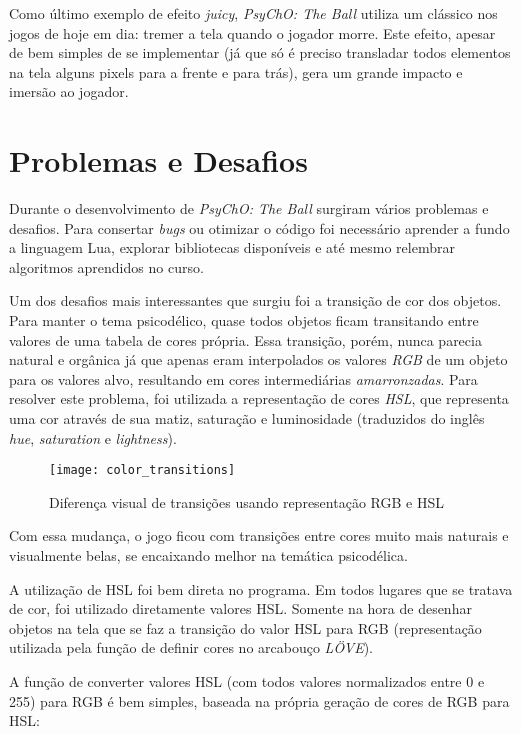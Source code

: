 Como último exemplo de efeito \textit{juicy}, \textit{PsyChO: The Ball} utiliza um clássico nos jogos de hoje em dia: tremer a tela quando o jogador morre. Este efeito, apesar de bem simples de se implementar (já que só é preciso transladar todos elementos na tela alguns pixels para a frente e para trás), gera um grande impacto e imersão ao jogador.

\section{Problemas e Desafios}
\label{sec:problemas_e_desafios}

Durante o desenvolvimento de \textit{PsyChO: The Ball} surgiram vários problemas e desafios. Para consertar \textit{bugs} ou otimizar o código foi necessário aprender a fundo a linguagem Lua, explorar bibliotecas disponíveis e até mesmo relembrar algoritmos aprendidos no curso.

Um dos desafios mais interessantes que surgiu foi a transição de cor dos objetos. Para manter o tema psicodélico, quase todos objetos ficam transitando entre valores de uma tabela de cores própria. Essa transição, porém, nunca parecia natural e orgânica já que apenas eram interpolados os valores \textit{RGB} de um objeto para os valores alvo, resultando em cores intermediárias \textit{amarronzadas}. Para resolver este problema, foi utilizada a representação de cores \textit{HSL}, que representa uma cor através de sua matiz, saturação e luminosidade (traduzidos do inglês \textit{hue}, \textit{saturation} e \textit{lightness}).

\begin{figure}[h!]
\texttt{[image: color\_transitions]}
\centering
\caption{Diferença visual de transições usando representação RGB e HSL}
\end{figure}

Com essa mudança, o jogo ficou com transições entre cores muito mais naturais e visualmente belas, se encaixando melhor na temática psicodélica.

A utilização de HSL foi bem direta no programa. Em todos lugares que se tratava de cor, foi utilizado diretamente valores HSL. Somente na hora de desenhar objetos na tela que se faz a transição do valor HSL para RGB (representação utilizada pela função de definir cores no arcabouço \textit{LÖVE}).

A função de converter valores HSL (com todos valores normalizados entre 0 e 255) para RGB é bem simples, baseada na própria geração de cores de RGB para HSL:

